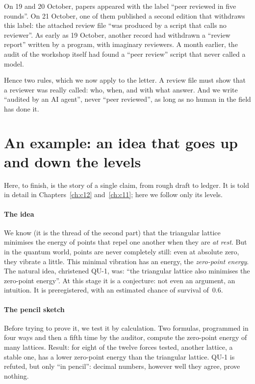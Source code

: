 On 19 and 20 October, papers appeared with the label ``peer reviewed in five rounds''. On 21 October, one of them
published a second edition that withdraws this label: the attached review file ``was produced by a script that calls
no reviewer''. As early as 19 October, another
record had withdrawn a ``review report'' written by a program, with imaginary reviewers.
A month earlier, the audit of the workshop itself had found a ``peer review'' script that never called a model.

Hence two rules, which we now apply to the letter. A review file must show that a reviewer was really called: who,
when, and with what answer. And we write ``audited by an AI agent'', never ``peer reviewed'', as long as no human in
the field has done it.

\section{An example: an idea that goes up and down the levels}

Here, to finish, is the story of a single claim, from rough draft to ledger. It is told in detail in
Chapters~\ref{ch:c12} and~\ref{ch:c11}; here we follow only its levels.

\paragraph{The idea} We know (it is the thread of the second part) that the triangular lattice minimises the energy
of points that repel one another when they are \emph{at rest}. But in the quantum world, points are never completely
still: even at absolute zero, they vibrate a little. This minimal vibration has an energy, the \emph{zero-point
energy}. The natural idea, christened QU-1, was: ``the triangular lattice also minimises the zero-point energy''. At
this stage it is a conjecture: not even an argument, an intuition. It is preregistered, with an estimated chance of
survival of~0.6.

\paragraph{The pencil sketch } Before trying to prove it, we test it by calculation. Two formulas, programmed in four ways
and then a fifth time by the auditor, compute the zero-point energy of many lattices. Result: for eight of the twelve forces tested, another
lattice, a stable one, has a lower zero-point energy than the triangular lattice. QU-1 is refuted, but only ``in
pencil'': decimal numbers, however well they agree, prove nothing.

